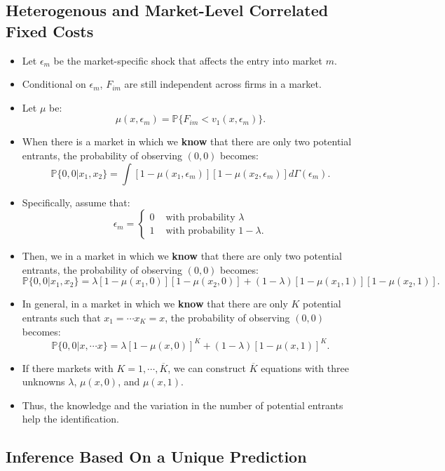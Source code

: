 \documentclass[]{book}
\begin{document}
\subsection{Heterogenous and Market-Level Correlated Fixed
Costs}\label{heterogenous-and-market-level-correlated-fixed-costs}

\begin{itemize}
\item
  Let \(\epsilon_m\) be the market-specific shock that affects the entry
  into market \(m\).
\item
  Conditional on \(\epsilon_m\), \(F_{im}\) are still independent across
  firms in a market.
\item
  Let \(\mu\) be: \[
  \mu(x, \epsilon_m) = \mathbb{P}\{F_{im} < v_1(x, \epsilon_m)\}.
  \]
\item
  When there is a market in which we \textbf{know} that there are only
  two potential entrants, the probability of observing \((0, 0)\)
  becomes: \[
  \mathbb{P}\{0, 0|x_1, x_2\} = \int [1 - \mu(x_1, \epsilon_m)] [1 - \mu(x_2, \epsilon_m)] d \Gamma(\epsilon_m).
  \]
\item
  Specifically, assume that: \[
  \epsilon_m 
  = 
  \begin{cases}
  0 & \text{   with probability   } \lambda \\
  1 & \text{   with probability   } 1 - \lambda.
  \end{cases}
  \]
\item
  Then, we in a market in which we \textbf{know} that there are only two
  potential entrants, the probability of observing \((0, 0)\) becomes:
  \[
  \mathbb{P}\{0, 0|x_1, x_2\} = \lambda [1 - \mu(x_1, 0)] [1 - \mu(x_2, 0)] + (1 - \lambda) [1 - \mu(x_1, 1)] [1 - \mu(x_2, 1)].
  \]
\item
  In general, in a market in which we \textbf{know} that there are only
  \(K\) potential entrants such that \(x_1 = \cdots x_K = x\), the
  probability of observing \((0, 0)\) becomes: \[
  \mathbb{P}\{0, 0|x, \cdots x\} = \lambda [1 - \mu(x, 0)]^K + (1 - \lambda) [1 - \mu(x, 1)]^K.
  \]
\item
  If there markets with \(K = 1, \cdots, \overline{K}\), we can
  construct \(\overline{K}\) equations with three unknowns \(\lambda\),
  \(\mu(x, 0)\), and \(\mu(x, 1)\).
\item
  Thus, the knowledge and the variation in the number of potential
  entrants help the identification.
\end{itemize}

\subsection{Inference Based On a Unique
Prediction}\label{inference-based-on-a-unique-prediction}
\end{document}
